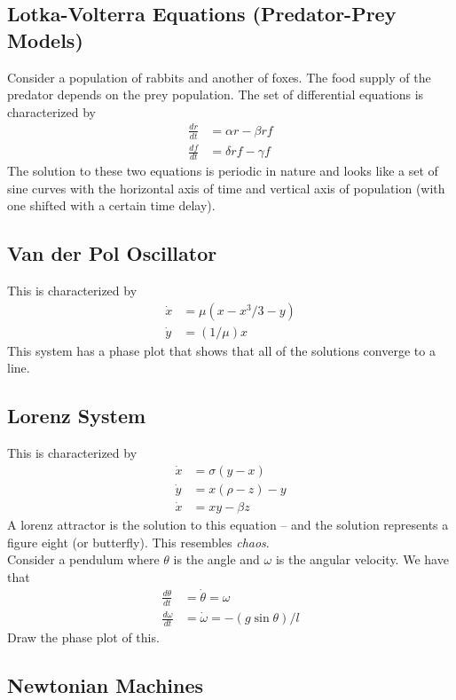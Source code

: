 \documentclass[11pt]{article}
\theoremstyle{definition}
\begin{document}
\subsection{Lotka-Volterra Equations (Predator-Prey Models)}
Consider a population of rabbits and another of foxes. The food supply of the predator depends on the prey population. The set of differential equations is characterized by 
\begin{align*}
\frac{dr}{dt} &= \alpha r - \beta r f \\
\frac{df}{dt} &= \delta r f - \gamma f
\end{align*}
The solution to these two equations is periodic in nature and looks like a set of sine curves with the horizontal axis of time and vertical axis of population (with one shifted with a certain time delay). 

\subsection{Van der Pol Oscillator}
This is characterized by 
\begin{align*}
\dot{x} &= \mu (x - x^3/3 - y) \\
\dot{y} &= (1/\mu)x
\end{align*}
This system has a phase plot that shows that all of the solutions converge to a line. 

\subsection{Lorenz System}
This is characterized by 
\begin{align*}
\dot{x} &= \sigma(y-x) \\
\dot{y} &= x(\rho - z) - y \\
\dot{x} &= xy - \beta z
\end{align*}
A lorenz attractor is the solution to this equation -- and the solution represents a figure eight (or butterfly). This resembles \textit{chaos}. \\

\noindent Consider a pendulum where $\theta$ is the angle and $\omega$ is the angular velocity. We have that 
\begin{align*}
\frac{d \theta}{dt} &= \dot{\theta} = \omega \\
\frac{d \omega}{dt} &= \dot{\omega} = -(g \sin \theta)/l
\end{align*}
Draw the phase plot of this.

\subsection{Newtonian Machines}
\end{document}
